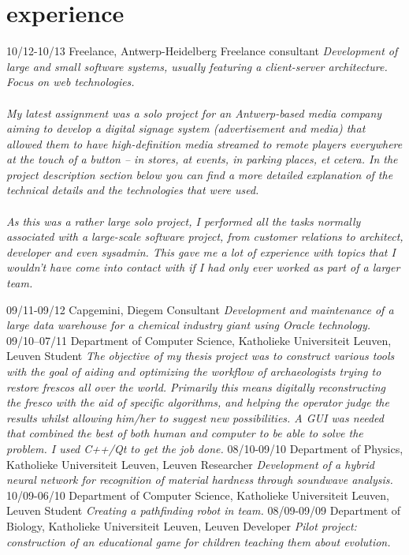 \documentclass[]{friggeri-cv}
\begin{document}
\section{experience}

\begin{entrylist}
  \entry
    {10/12-10/13}
    {Freelance, Antwerp-Heidelberg}
    {Freelance consultant}
    {\emph{Development of large and small software systems, usually featuring a client-server architecture. Focus on web technologies. \\\\ My latest assignment was a solo project for an Antwerp-based media company aiming to develop a digital signage system (advertisement and media) that allowed them to have high-definition media streamed to remote players everywhere at the touch of a button -- in stores, at events, in parking places, et cetera. In the project description section below you can find a more detailed explanation of the technical details and the technologies that were used. \\\\ As this was a rather large solo project, I performed all the tasks normally associated with a large-scale software project, from customer relations to architect, developer and even sysadmin. This gave me a lot of experience with topics that I wouldn't have come into contact with if I had only ever worked as part of a larger team.
    }}
\end{entrylist}


\begin{entrylist}
  \entry
    {09/11-09/12}
    {Capgemini, Diegem}
    {Consultant}
    {\emph{Development and maintenance of a large data warehouse for a chemical industry giant using Oracle technology.}}
  \entry
    {09/10--07/11}
    {Department of Computer Science, Katholieke Universiteit Leuven, Leuven}
    {Student}
    {\emph{The objective of my thesis project was to construct various tools with the goal of aiding and optimizing the workflow of archaeologists trying to restore frescos all over the world. Primarily this means digitally reconstructing the fresco with the aid of specific algorithms, and helping the operator judge the results whilst allowing him/her to suggest new possibilities. A GUI was needed that combined the best of both human and computer to be able to solve the problem. I used C++/Qt to get the job done.}}
  \entry
    {08/10-09/10}
    {Department of Physics, Katholieke Universiteit Leuven, Leuven}
    {Researcher}
    {\emph{Development of a hybrid neural network for recognition of material hardness through soundwave analysis.}}
  \entry
    {10/09-06/10}
    {Department of Computer Science, Katholieke Universiteit Leuven, Leuven}
    {Student}
    {\emph{Creating a pathfinding robot in team.}}
  \entry
    {08/09-09/09}
    {Department of Biology, Katholieke Universiteit Leuven, Leuven}
    {Developer}
    {\emph{Pilot project: construction of an educational game for children teaching them about evolution.}}
\end{entrylist}
\end{document}
